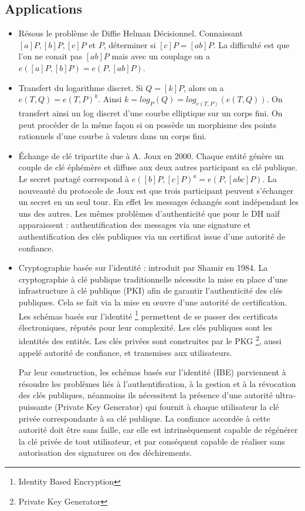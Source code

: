 \subsection{Applications}
\begin{itemize}[label=--]
    \item Résous le problème de Diffie Helman Décisionnel. Connaissant $[a]P, [b]P, [c]P$ et $P$, déterminer si $[c]P = [ab]P$. La difficulté est que l'on ne conait pas $[ab]P$ mais avec un couplage on a $e([a]P, [b]P) = e(P, [ab]P)$.
    \item Transfert du logarithme discret. Si $Q = [k]P$, alors on a $e(T, Q) = e(T, P)^k$. Ainsi $k = log_{P}(Q) = log_{e(T,P)}(e(T, Q))$. On transfert ainsi un log discret d'une courbe elliptique sur un corps fini. On peut procéder de la même façon si on possède un morphisme des points rationnels d'une courbe à valeurs dans un corps fini.
    \item \'{E}change de clé tripartite due à A. Joux en 2000. Chaque entité génère un couple de clé éphémère et diffuse aux deux autres participant sa clé publique. Le secret partagé correspond à $e([b]P, [c]P)^a = e(P, [abc]P)$. La nouveauté du protocole de Joux est que trois participant peuvent s'échanger un secret en un seul tour. En effet les messages échangés sont indépendant les uns des autres. Les mêmes problèmes d'authenticité que pour le DH naïf apparaissent : authentification des messages via une signature et authentification des clés publiques via un certificat issue d'une autorité de confiance.
    \item Cryptographie basée sur l'identité : introduit par Shamir en 1984. La cryptographie à clé publique traditionnelle nécessite la mise en place d'une infrastructure à clé publique (PKI) afin de garantir l'authenticité des clés publiques. Cela se fait via la mise en  \oe{}uvre d'une autorité de certification. Les schémas basés sur l'identité \footnote{Identity Based Encryption} permettent de se passer des certificats électroniques, réputés pour leur complexité. Les clés publiques sont les identités des entités. Les clés privées sont construites par le PKG \footnote{Private Key Generator}, aussi appelé autorité de confiance, et transmises aux utilisateurs.
    
    Par leur construction, les schémas basés sur l'identité (IBE) parviennent à résoudre les problèmes liés à l'authentification, à la gestion et à la révocation des clés publiques, néanmoins ils nécessitent la présence d'une autorité ultra-puissante (Private Key Generator) qui fournit à chaque utilisateur la clé privée correspondante à sa clé publique. La confiance accordée à cette autorité doit être sans faille, car elle est intrinsèquement capable de régénérer la clé privée de tout utilisateur, et par conséquent capable de réaliser sans autorisation des signatures ou des déchirements.
    

\end{itemize}
